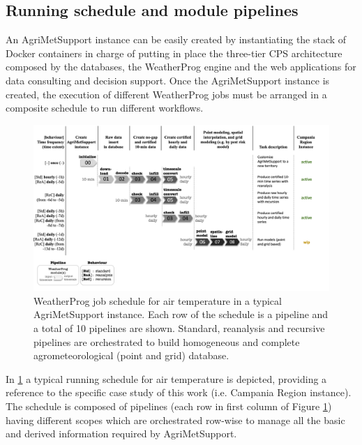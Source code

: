 \documentclass[authoryear,preprint,review,12pt]{elsarticle}
\newcommand{\statusblock}[3]{
    \ifthenelse{\equal{#2}{todo}}
        {\textcolor{red}{#1 (TO DO): #3}}
        {}
    \ifthenelse{\equal{#2}{wip}}
        {\textcolor{magenta}{#1 (IN PROGRESS): #3}}
        {}
    \ifthenelse{\equal{#2}{update}}
        {\textcolor{blue}{#1 (UPDATE): #3}}
        {}
    \ifthenelse{\equal{#2}{review}}
        {\textcolor{cyan}{#1 (REVIEW): #3}}
        {}
    \ifthenelse{\equal{#2}{done}}
        {\textcolor{PineGreen}{#1 (READY): #3}}
        {}
}
\begin{document}
\subsection{ Running schedule and module pipelines }

An Agri\-Met\-Support instance can be easily created by instantiating the stack of Docker containers in charge of putting in place the three-tier CPS architecture composed by the databases, the WeatherProg engine and the web applications for data consulting and decision support.
Once the Agri\-Met\-Support instance is created, the execution of different WeatherProg jobs must be arranged in a composite schedule to run %
different workflows.
\begin{figure}
	\centering %
	\includegraphics[scale=.6, angle=90, trim=0 2cm 7cm 2cm]{figures/WeatherProg-schedule-fig-v3.png}
	\caption{WeatherProg job schedule for air temperature in a typical Agri\-Met\-Support instance.
    Each row of the schedule is a pipeline and a total of 10 pipelines are shown.
    Standard, reanalysis and recursive pipelines are orchestrated to build homogeneous and complete agrometeorological (point and grid) database.}
	\label{Fig:weatherprog:calls}
\end{figure}
In \cref{Fig:weatherprog:calls} a typical running schedule for air temperature is depicted, providing a reference to the specific case study of this work (i.e. Campania Region instance).
The schedule is composed of pipelines (each row in first column of Figure \ref{Fig:weatherprog:calls}) having different scopes which are orchestrated row-wise to manage all the basic and derived information required by Agri\-Met\-Support.
\end{document}
